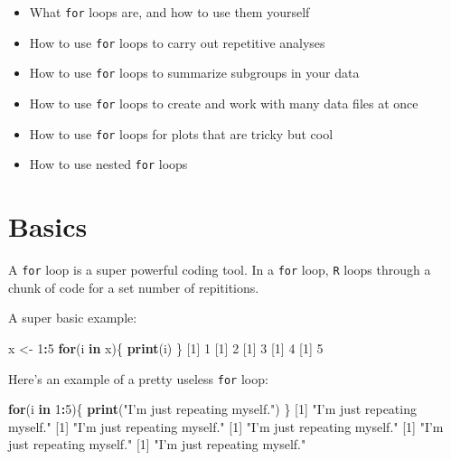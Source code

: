 \documentclass[
]{book}
\newenvironment{Shaded}{\begin{snugshade}}{\end{snugshade}}
\newcommand{\ControlFlowTok}[1]{\textcolor[rgb]{0.13,0.29,0.53}{\textbf{#1}}}
\newcommand{\DecValTok}[1]{\textcolor[rgb]{0.00,0.00,0.81}{#1}}
\newcommand{\KeywordTok}[1]{\textcolor[rgb]{0.13,0.29,0.53}{\textbf{#1}}}
\newcommand{\NormalTok}[1]{#1}
\newcommand{\OperatorTok}[1]{\textcolor[rgb]{0.81,0.36,0.00}{\textbf{#1}}}
\newcommand{\StringTok}[1]{\textcolor[rgb]{0.31,0.60,0.02}{#1}}
\providecommand{\tightlist}{%
  \setlength{\itemsep}{0pt}\setlength{\parskip}{0pt}}
\begin{document}
\begin{itemize}
\tightlist
\item
  What \texttt{for} loops are, and how to use them yourself\\
\item
  How to use \texttt{for} loops to carry out repetitive analyses\\
\item
  How to use \texttt{for} loops to summarize subgroups in your data\\
\item
  How to use \texttt{for} loops to create and work with many data files at once\\
\item
  How to use \texttt{for} loops for plots that are tricky but cool\\
\item
  How to use nested \texttt{for} loops
\end{itemize}

\hypertarget{basics-1}{%
\section*{Basics}\label{basics-1}}

A \texttt{for} loop is a super powerful coding tool. In a \texttt{for} loop, \texttt{R} loops through a chunk of code for a set number of repititions.

A super basic example:

\begin{Shaded}
\begin{Highlighting}[]
\NormalTok{x <-}\StringTok{ }\DecValTok{1}\OperatorTok{:}\DecValTok{5}
\ControlFlowTok{for}\NormalTok{(i }\ControlFlowTok{in}\NormalTok{ x)\{}
  \KeywordTok{print}\NormalTok{(i)}
\NormalTok{\}}
\NormalTok{[}\DecValTok{1}\NormalTok{] }\DecValTok{1}
\NormalTok{[}\DecValTok{1}\NormalTok{] }\DecValTok{2}
\NormalTok{[}\DecValTok{1}\NormalTok{] }\DecValTok{3}
\NormalTok{[}\DecValTok{1}\NormalTok{] }\DecValTok{4}
\NormalTok{[}\DecValTok{1}\NormalTok{] }\DecValTok{5}
\end{Highlighting}
\end{Shaded}

Here's an example of a pretty useless \texttt{for} loop:

\begin{Shaded}
\begin{Highlighting}[]
\ControlFlowTok{for}\NormalTok{(i }\ControlFlowTok{in} \DecValTok{1}\OperatorTok{:}\DecValTok{5}\NormalTok{)\{}
  \KeywordTok{print}\NormalTok{(}\StringTok{"I'm just repeating myself."}\NormalTok{)}
\NormalTok{\}}
\NormalTok{[}\DecValTok{1}\NormalTok{] }\StringTok{"I'm just repeating myself."}
\NormalTok{[}\DecValTok{1}\NormalTok{] }\StringTok{"I'm just repeating myself."}
\NormalTok{[}\DecValTok{1}\NormalTok{] }\StringTok{"I'm just repeating myself."}
\NormalTok{[}\DecValTok{1}\NormalTok{] }\StringTok{"I'm just repeating myself."}
\NormalTok{[}\DecValTok{1}\NormalTok{] }\StringTok{"I'm just repeating myself."}
\end{Highlighting}
\end{Shaded}
\end{document}

